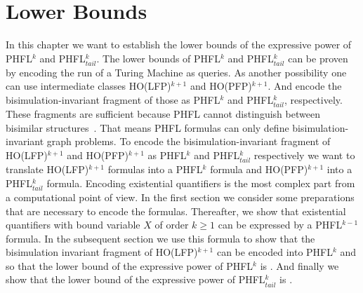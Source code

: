 
\chapter{Lower Bounds}\label{ch:lowerBounds}

In this chapter we want to establish the lower bounds of the expressive power of PHFL$^k$ and PHFL$^k_{tail}$. The
lower bounds of PHFL$^k$ and PHFL$^k_{tail}$ can be proven by encoding the run of a Turing Machine as queries.
As another possibility one can use intermediate classes HO(LFP)$^{k+1}$ and HO(PFP)$^{k+1}$. And encode the bisimulation-invariant fragment of those as PHFL$^k$ and
PHFL$^k_{tail}$, respectively. These fragments are sufficient because PHFL cannot distinguish between bisimilar structures~\cite{lange2014capturing}. That means PHFL formulas can only define bisimulation-invariant
graph problems. To encode the bisimulation-invariant fragment of HO(LF\-P)$^{k+1}$ and HO(PFP)$^{k+1}$ as PHFL$^k$ and
PHFL$^{k}_{tail}$ respectively we want to translate HO(LFP)$^{k+1}$ formulas into a PHFL$^k$ formula and 
HO(PFP)$^{k+1}$ into a PHFL$^k_{tail}$ formula. Encoding existential quantifiers is the most complex part from a computational point of view. In the 
first section we consider some preparations that are necessary to encode the formulas. Thereafter,  we show that existential 
quantifiers with bound variable $X$ of order $k \geq 1$ can be expressed by a PHFL$^{k-1}$ formula. In the subsequent section we 
use this formula to show that the bisimulation invariant fragment of HO(LFP)$^{k+1}$ can be encoded into PHFL$^k$ and so 
that the lower bound of the expressive power of PHFL$^k$ is . And finally we show that the lower bound 
of the expressive power of PHFL$^k_{tail}$ is .








